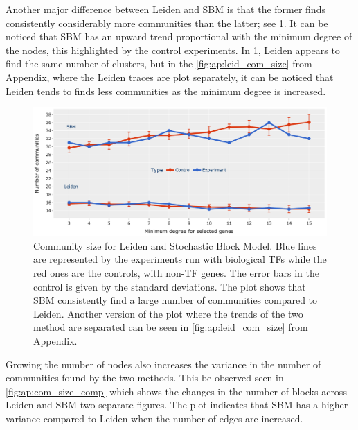 Another major difference between Leiden and SBM is that the former finds consistently considerably more communities than the latter; see \cref{fig:N_I:comp_size_com_det}. It can be noticed that SBM has an upward trend proportional with the minimum degree of the nodes, this highlighted by the control experiments. In \cref{fig:N_I:comp_size_com_det}, Leiden appears to find the same number of clusters, but in the \cref{fig:ap:leid_com_size} from Appendix, where the Leiden traces are plot separately, it can be noticed that Leiden tends to finds less communities as the minimum degree is increased. 

\begin{figure}[!t]   
    \centering
    \includegraphics[width=1.0\textwidth,keepaspectratio]{Sections/Network_I/Resources/selective_pruning/com_comp/sbm_Leiden_combNum.png}
      \caption[Leiden vs SBM: Number of communities found]{Community size for Leiden and Stochastic Block Model. Blue lines are represented by the experiments run with biological TFs while the red ones are the controls, with non-TF genes. The error bars in the control is given by the standard deviations. The plot shows that SBM consistently find a large number of communities compared to Leiden. Another version of the plot where the trends of the two method are separated can be seen in \cref{fig:ap:leid_com_size} from Appendix.}
    \label{fig:N_I:comp_size_com_det}
\end{figure}

Growing the number of nodes also increases the variance in the number of communities found by the two methods. This be observed seen in \cref{fig:ap:com_size_comp} which shows the changes in the number of blocks across Leiden and SBM two separate figures. The plot indicates that SBM has a higher variance compared to Leiden when the number of edges are increased.

